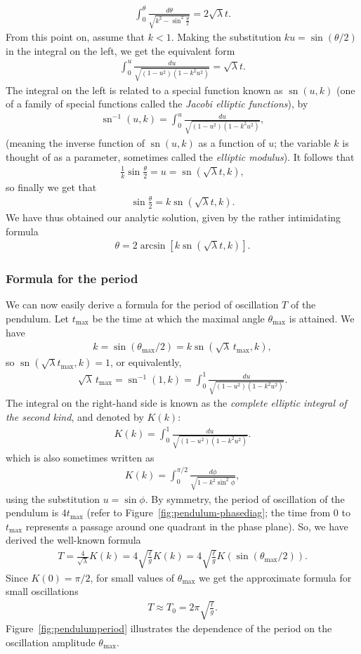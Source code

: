 \documentclass[12pt]{amsart}
\newcommand{\eq}[1]{\begin{equation}\begin{split}#1\end{split}\end{equation}}
\newcommand{\eqst}[1]{\begin{align*}#1\end{align*}}
\begin{document}
\eq{ \label{eq:ellipticintegral-trig}
\int_0^\theta \frac{d\theta}{\sqrt{k^2-\sin^2 \tfrac{\theta}{2}}} = 2\sqrt{\lambda} t.
}
From this point on, assume that $k<1$.
Making the substitution $ku = \sin(\theta/2)$ in the integral on the left, we get the equivalent form
\eqst{
\int_0^u \frac{du}{\sqrt{(1-u^2)(1-k^2 u^2)}} = \sqrt{\lambda} t.
}
The integral on the left is related to a special function known as $\operatorname{sn}(u,k)$ (one of a family of special functions called the \emph{Jacobi elliptic functions}), by
\eqst{
\operatorname{sn}^{-1}(u,k) = \int_0^u \frac{du}{\sqrt{(1-u^2)(1-k^2 u^2)}},
}
(meaning the inverse function of $\operatorname{sn}(u,k)$ as a function of $u$; the variable $k$ is thought of as a parameter, sometimes called the \emph{elliptic modulus}). It follows that
\eqst{
\frac{1}{k}\sin\frac{\theta}{2} = u = \operatorname{sn}(\sqrt{\lambda}t ,k),
}
so finally we get that
\eq{ \label{eq:pendulum-almostfinal}
\sin\frac{\theta}{2} = k \operatorname{sn}(\sqrt{\lambda}t ,k).
}
We have thus obtained our analytic solution, given by the rather intimidating formula
\eqst{
\theta  = 2 \arcsin \left[k \operatorname{sn}(\sqrt{\lambda}t ,k)\right].
}

\subsubsection{Formula for the period} 
We can now easily derive a formula for the period of oscillation $T$ of the pendulum. Let $t_{\textrm{max}}$ be the time at which the maximal angle $\theta_{\textrm{max}}$ is attained. We have
\eqst{
k = \sin(\theta_{\textrm{max}}/2) = k \operatorname{sn}(\sqrt{\lambda}\, t_{\textrm{max}},k),
}
so $\operatorname{sn}(\sqrt{\lambda} t_{\textrm{max}},k)=1$, or equivalently,
\eqst{
\sqrt{\lambda}\, t_{\textrm{max}} = \operatorname{sn}^{-1}(1,k) = \int_0^1 \frac{du}{\sqrt{(1-u^2)(1-k^2u^2)}}.
}
The integral on the right-hand side is known as the \emph{complete elliptic integral of the second kind}, and denoted by $K(k)$:
\eqst{
K(k) = \int_0^1 \frac{du}{\sqrt{(1-u^2)(1-k^2u^2)}}.
}
which is also sometimes written as
\eqst{
K(k) = \int_0^{\pi/2} \frac{d\phi}{\sqrt{1-k^2 \sin^2\phi}},
}
using the substitution $u=\sin \phi$.
By symmetry, the period of oscillation of the pendulum is $4t_{\textrm{max}}$ (refer to Figure~\ref{fig:pendulum-phasediag}; the time from $0$ to $t_{\textrm{max}}$ represents a passage around one quadrant in the phase plane). So, we have derived the well-known formula
\eqst{
T= \frac{4}{\sqrt{\lambda}}K(k) = 4\sqrt{\frac{\ell}{g}} K(k)
= 4\sqrt{\frac{\ell}{g}} K(\sin (\theta_{\textrm{max}}/2)).
}
Since $K(0)=\pi/2$, for small values of $\theta_{\textrm{max}}$ we get the approximate formula for small oscillations
\eqst{
T \approx T_0 = 2\pi \sqrt{\frac{\ell}{g}}.
}
Figure~\ref{fig:pendulumperiod} illustrates the dependence of the period on the oscillation amplitude $\theta_{\textrm{max}}$.
\end{document}

